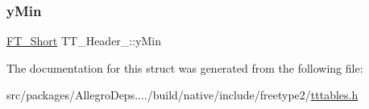 \mbox{\label{struct_t_t___header___ac6aad4966bac8a96c5bc48765b3d694a}} 
\subsubsection{\texorpdfstring{y\+Min}{yMin}}
{\footnotesize\ttfamily \hyperlink{fttypes_8h_aa7279be89046a2563cd3d4d6651fbdcf}{F\+T\+\_\+\+Short} T\+T\+\_\+\+Header\+\_\+\+::y\+Min}



The documentation for this struct was generated from the following file\+:\begin{DoxyCompactItemize}
\item 
src/packages/\+Allegro\+Deps..../build/native/include/freetype2/\hyperlink{tttables_8h}{tttables.\+h}\end{DoxyCompactItemize}
